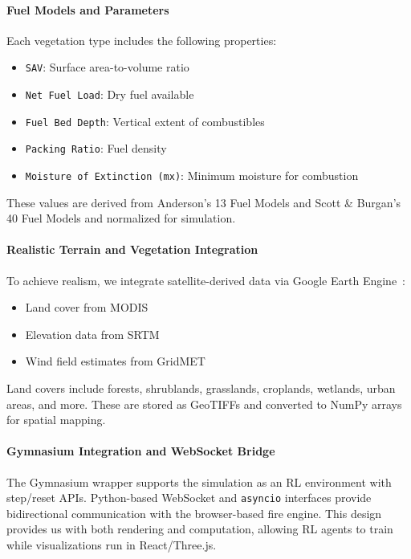 \documentclass[conference]{IEEEtran}
\begin{document}
\paragraph{Fuel Models and Parameters}
Each vegetation type includes the following properties:
\begin{itemize}
    \item \texttt{SAV}: Surface area-to-volume ratio
    \item \texttt{Net Fuel Load}: Dry fuel available
    \item \texttt{Fuel Bed Depth}: Vertical extent of combustibles
    \item \texttt{Packing Ratio}: Fuel density
    \item \texttt{Moisture of Extinction (mx)}: Minimum moisture for combustion
\end{itemize}
These values are derived from Anderson’s 13 Fuel Models and Scott \& Burgan’s 40 Fuel Models and normalized for simulation.

\paragraph{Realistic Terrain and Vegetation Integration}
To achieve realism, we integrate satellite-derived data via Google Earth Engine~\cite{earth_engine}:
\begin{itemize}
    \item Land cover from MODIS
    \item Elevation data from SRTM
    \item Wind field estimates from GridMET~\cite{gridmet}
\end{itemize}
Land covers include forests, shrublands, grasslands, croplands, wetlands, urban areas, and more. These are stored as GeoTIFFs and converted to NumPy arrays for spatial mapping.



\paragraph{Gymnasium Integration and WebSocket Bridge}
The Gymnasium wrapper supports the simulation as an RL environment with step/reset APIs. Python-based WebSocket and \texttt{asyncio} interfaces provide bidirectional communication with the browser-based fire engine. This design provides us with both rendering and computation, allowing RL agents to train while visualizations run in React/Three.js.
\end{document}
